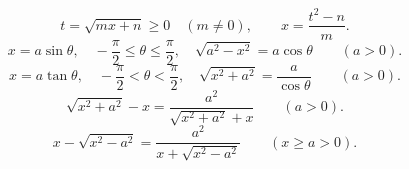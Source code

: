 \[
 t=\sqrt{mx+n}\ge0\quad(m\ne0),\qquad x=\frac{t^2-n}{m}.
\]
\[
 x=a\sin\theta,\quad -\frac{\pi}{2}\le\theta\le\frac{\pi}{2},\quad
 \sqrt{a^2-x^2}=a\cos\theta\qquad(a>0).
\]
\[
 x=a\tan\theta,\quad -\frac{\pi}{2}<\theta<\frac{\pi}{2},\quad
 \sqrt{x^2+a^2}=\frac{a}{\cos\theta}\qquad(a>0).
\]
\[
 \sqrt{x^2+a^2}-x=\frac{a^2}{\sqrt{x^2+a^2}+x}\qquad(a>0).
\]
\[
 x-\sqrt{x^2-a^2}=\frac{a^2}{x+\sqrt{x^2-a^2}}
 \qquad(x\ge a>0).
\]
